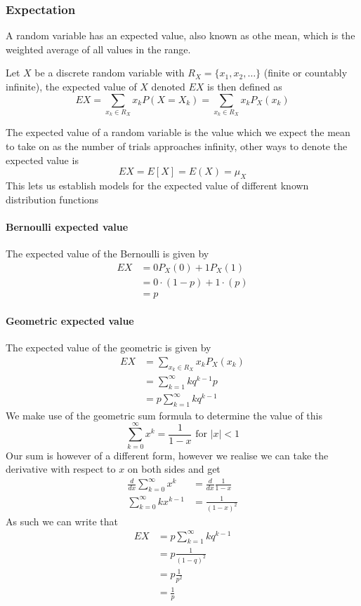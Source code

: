 \subsubsection{Expectation}
A random variable has an expected value, also known as othe mean, which is the weighted average of all values in the range.
\begin{definition}
    Let $X$ be a discrete random variable with $R_X=\{x_{1},x_{2},\ldots\}$ (finite or countably infinite), the expected value of $X$ denoted $EX$ is then defined as
    \[
        EX=\sum_{x_{k}\in R_X}x_{k}P(X=X_{k})=\sum_{x_{k}\in R_X}x_{k}P_{X}(x_{k})
    \]
\end{definition}
The expected value of a random variable is the value which we expect the mean to take on as the number of trials approaches infinity, other ways to denote the expected value is
\[
    EX=E[X]=E(X)=\mu_{X}
\]
This lets us establish models for the expected value of different known distribution functions

\paragraph{Bernoulli expected value}
The expected value of the Bernoulli is given by
\begin{align*}
    EX&=0P_{X}(0)+1P_{X}(1) \\
      &=0\cdot(1-p)+1\cdot(p) \\
      &=p
\end{align*}
\paragraph{Geometric expected value}
The expected value of the geometric is given by
\begin{align*}
    EX&=\sum_{x_{k}\in R_{X}}x_{k}P_{X}(x_{k}) \\
      &=\sum_{k=1}^{\infty}kq^{k-1}p \\ 
      &=p\sum_{k=1}^{\infty}kq^{k-1}
\end{align*}
We make use of the geometric sum formula to determine the value of this
\[
    \sum_{k=0}^{\infty}x^{k}=\frac{1}{1-x}\text{ for }|x|<1
\]
Our sum is however of a different form, however we realise we can take the derivative with respect to $x$ on both sides and get
\begin{align*}
    \frac{d}{dx}\sum_{k=0}^{\infty}x^{k}&=\frac{d}{dx}\frac{1}{1-x} \\
    \sum_{k=0}^{\infty}kx^{k-1}&=\frac{1}{(1-x)^{2}}
\end{align*}
As such we can write that
\begin{align*}
    EX&=p\sum_{k=1}^{\infty}kq^{k-1} \\
      &=p\frac{1}{(1-q)^{2}} \\
      &=p\frac{1}{p^{2}} \\
      &=\frac{1}{p}
\end{align*}
